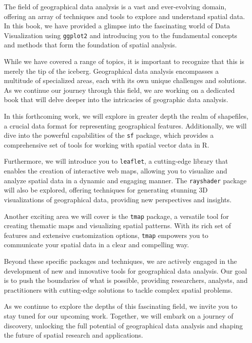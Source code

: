 \documentclass[
  letterpaper,
]{scrbook}
\begin{document}
The field of geographical data analysis is a vast and ever-evolving
domain, offering an array of techniques and tools to explore and
understand spatial data. In this book, we have provided a glimpse into
the fascinating world of Data Visualization using \texttt{ggplot2} and
introducing you to the fundamental concepts and methods that form the
foundation of spatial analysis.

While we have covered a range of topics, it is important to recognize
that this is merely the tip of the iceberg. Geographical data analysis
encompasses a multitude of specialized areas, each with its own unique
challenges and solutions. As we continue our journey through this field,
we are working on a dedicated book that will delve deeper into the
intricacies of geographic data analysis.

In this forthcoming work, we will explore in greater depth the realm of
shapefiles, a crucial data format for representing geographical
features. Additionally, we will dive into the powerful capabilities of
the \texttt{sf} package, which provides a comprehensive set of tools for
working with spatial vector data in R.

Furthermore, we will introduce you to \texttt{leaflet}, a cutting-edge
library that enables the creation of interactive web maps, allowing you
to visualize and analyze spatial data in a dynamic and engaging manner.
The \texttt{rayshader} package will also be explored, offering
techniques for generating stunning 3D visualizations of geographical
data, providing new perspectives and insights.

Another exciting area we will cover is the \texttt{tmap} package, a
versatile tool for creating thematic maps and visualizing spatial
patterns. With its rich set of features and extensive customization
options, \texttt{tmap} empowers you to communicate your spatial data in
a clear and compelling way.

Beyond these specific packages and techniques, we are actively engaged
in the development of new and innovative tools for geographical data
analysis. Our goal is to push the boundaries of what is possible,
providing researchers, analysts, and practitioners with cutting-edge
solutions to tackle complex spatial problems.

As we continue to explore the depths of this fascinating field, we
invite you to stay tuned for our upcoming work. Together, we will embark
on a journey of discovery, unlocking the full potential of geographical
data analysis and shaping the future of spatial research and
applications.
\end{document}
